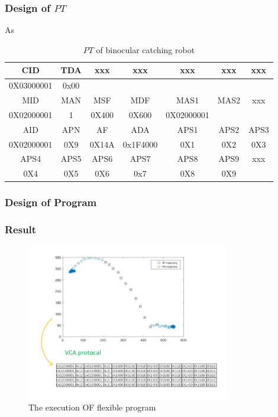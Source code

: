 \documentclass[journal,UTF8]{IEEEtran}
\begin{document}
\subsubsection{Design of $PT$}
As 
\begin{table}
	\scriptsize \caption{$PT$ of binocular catching robot}
	\label{table:PTofRobot}
	\begin{center}
		\renewcommand{\arraystretch}{1.4}
		\setlength\tabcolsep{3pt}
		\begin{tabular}{|c|c|c|c|c|c|c|}
			\hline
			CID  & TDA   &xxx &xxx& xxx  &xxx &xxx \\
			\hline
			0X03000001&0x00&& &&&\\
			\hline
			MID   & MAN  & MSF  & MDF  &MAS1    & MAS2&xxx\\
			\hline
			0X02000001 & 1  & 0X400  & 0X600   &0X02000001   & &\\
			\hline
			AID  & APN  & AF  &ADA  &APS1   &APS2&APS3\\
			\hline
			0X02000001 & 0X9  & 0X14A  &0x1F4000  &0X1   &0X2 &0X3\\
			\hline
			APS4  & APS5  & APS6  &APS7   &APS8   &APS9&xxx\\
			\hline
			0X4  & 0X5  & 0X6  &0x7  &0X8  &0X9&\\
			\hline
		\end{tabular}
	\end{center}
\end{table}

\subsubsection{Design of Program}

\subsubsection{Result}



\begin{figure}
	\centering
	\includegraphics[width=3.5in]{fig/PFofRobot.pdf}
	\caption{ The execution OF flexible program}
	\label{fig:settingexecutionbitinACPTD}
\end{figure}
\end{document}

